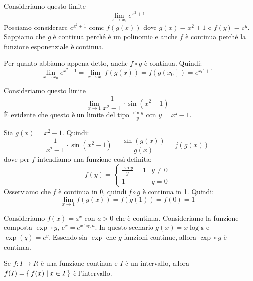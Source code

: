\begin{example}
Consideriamo questo limite
\begin{equation*}
\lim_{x \to x_0} e^{x^2+1} 
\end{equation*}
Possiamo considerare $e^{x^2+1}$ come $f(g(x))$ dove $g(x) = x^2+1$ e $f(y)=e^y$. Sappiamo che $g$ è continua perché è un polinomio e anche $f$ è continua perché la funzione esponenziale è continua. 

Per quanto abbiamo appena detto, anche $f \circ g$ è continua. Quindi:
\begin{equation*}
\lim_{x \to x_0} e^{x^2+1} = \lim_{x \to x_0} f(g(x)) = f(g(x_0)) = e^{{x_0}^2 + 1}
\end{equation*}
\end{example}

\begin{example}
Consideriamo questo limite
\begin{equation*}
\lim_{x \to 1} \frac{1}{x^2-1} \cdot \sin (x^2-1)
\end{equation*}
È evidente che questo è un limite del tipo $\frac{\sin y}{y}$ con $y=x^2-1$.

Sia $g(x) = x^2-1$. Quindi:
\begin{equation*}
\frac{1}{x^2-1} \cdot \sin (x^2-1) = \frac{\sin (g(x))}{g(x)} = f(g(x))
\end{equation*}
dove per $f$ intendiamo una funzione così definita:
\begin{equation*}
f(y) = \begin{cases}
\frac{\sin y}{y} = 1 & y \neq 0 \\
1 & y = 0
\end{cases}
\end{equation*}
Osserviamo che $f$ è continua in 0, quindi $f \circ g$ è continua in 1. Quindi:
\begin{equation*}
\lim_{x \to 1} f(g(x)) = f(g(1)) = f(0) = 1
\end{equation*}
\end{example}

\begin{example}
Consideriamo $f(x) = a^x$ con $a > 0$ che è continua. Consideriamo la funzione composta $\exp \circ y$, $e^x = e^{x \log a}$. In questo scenario $g(x) = x \log a$ e $\exp (y) = e^y$. Essendo sia $\exp$ che $g$ funzioni continue, allora $\exp \circ g$ è continua.
\end{example}

\begin{theorem}
Se $f : I \to R$ è una funzione continua e $I$ è un intervallo, allora $f(I) = \set{f(x) | x \in I}$ è l'intervallo.
\end{theorem}

